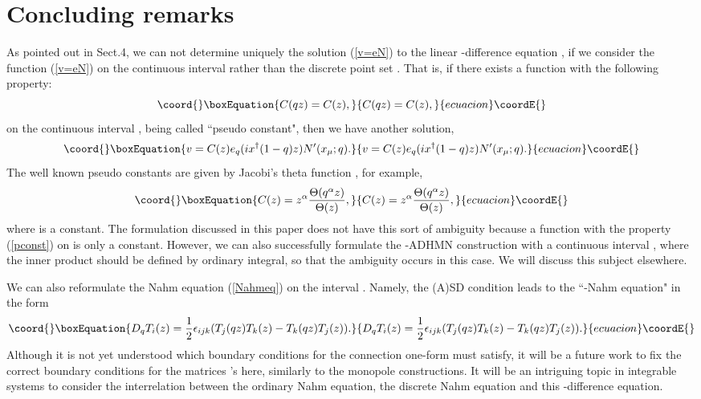 \documentclass[a4paper,10pt]{article}
\begin{document}
\section{Concluding remarks}
As pointed out in Sect.4, we can not determine uniquely the solution (\ref{v=eN}) to the linear \coordHE{}-difference equation \coordHE{}, if we consider the function (\ref{v=eN}) on the continuous interval \coordHE{} rather than the discrete point set \coordHE{}. 
That is, if there exists a function with the following property:
\begin{equation}\coord{}\boxEquation{
C(qz)=C(z), \label{pconst}
}{
C(qz)=C(z), }{ecuacion}\coordE{}\end{equation}
on the continuous interval \coordHE{}, being called ``pseudo constant", then we have another solution,   
\begin{equation}\coord{}\boxEquation{
v=C(z)e_q(ix^\dagger (1-q)z)N'(x_\mu;q).\label{v=CeN} 
}{
v=C(z)e_q(ix^\dagger (1-q)z)N'(x_\mu;q).}{ecuacion}\coordE{}\end{equation}
The well known pseudo constants are given by Jacobi's theta function \coordHE{} \cite{FR}, for example,
\begin{equation}\coord{}\boxEquation{
C(z)=z^{\alpha}\frac{\Theta(q^{\alpha}z)}{\Theta(z)}, \label{Jtheta} 
}{
C(z)=z^{\alpha}\frac{\Theta(q^{\alpha}z)}{\Theta(z)}, }{ecuacion}\coordE{}\end{equation}
where \myHighlight{$\alpha$}\coordHE{} is a constant.
The \coordHE{} formulation discussed in this paper does not have this sort of ambiguity because a function with the property (\ref{pconst}) on \coordHE{} is only a constant.
However, we can also successfully formulate the \coordHE{}-ADHMN construction with a continuous interval \coordHE{}, where the inner product should be defined by ordinary integral, so that the ambiguity occurs in this case.
We will discuss this subject elsewhere.


We can also reformulate the Nahm equation (\ref{Nahmeq}) on the interval \coordHE{}.
Namely, the (A)SD condition leads to the ``\coordHE{}-Nahm equation" in the form   
\begin{equation}\coord{}\boxEquation{
D_qT_i(z)=\frac{1}{2}\epsilon_{ijk}(T_j(qz)T_k(z)-T_k(qz)T_j(z)).
}{
D_qT_i(z)=\frac{1}{2}\epsilon_{ijk}(T_j(qz)T_k(z)-T_k(qz)T_j(z)).
}{ecuacion}\coordE{}\end{equation}
Although it is not yet understood which boundary conditions for the connection one-form must satisfy, it will be a future work to fix the correct boundary conditions for the matrices \coordHE{}'s here, similarly to the monopole constructions.
It will be an intriguing topic in integrable systems to consider the interrelation between the ordinary Nahm equation, the discrete Nahm equation and this \coordHE{}-difference equation.
\end{document}
